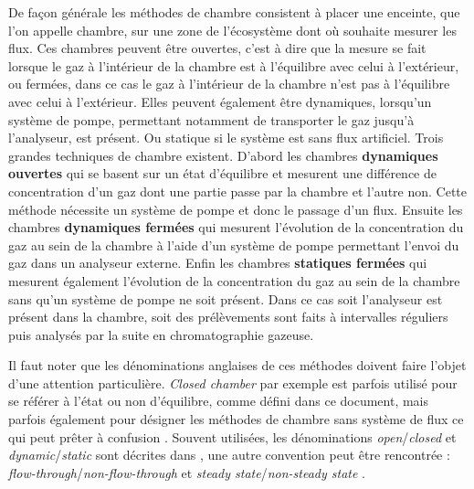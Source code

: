 De façon générale les méthodes de chambre consistent à placer une enceinte, que l'on appelle chambre, sur une zone de l'écosystème dont où souhaite mesurer les flux.
Ces chambres peuvent être ouvertes, c'est à dire que la mesure se fait lorsque le gaz à l'intérieur de la chambre est à l'équilibre avec celui à l'extérieur, ou fermées, dans ce cas le gaz à l'intérieur de la chambre n'est pas à l'équilibre avec celui à l'extérieur.
Elles peuvent également être dynamiques, lorsqu'un système de pompe, permettant notamment de transporter le gaz jusqu'à l'analyseur, est présent.
Ou statique si le système est sans flux artificiel.
Trois grandes techniques de chambre existent.
D'abord les chambres \textbf{dynamiques ouvertes} qui se basent sur un état d'équilibre et mesurent une différence de concentration d'un gaz dont une partie passe par la chambre et l'autre non. 
Cette méthode nécessite un système de pompe et donc le passage d'un flux.
Ensuite les chambres \textbf{dynamiques fermées} qui mesurent l'évolution de la concentration du gaz au sein de la chambre à l'aide d'un système de pompe permettant l'envoi du gaz dans un analyseur externe.
Enfin les chambres \textbf{statiques fermées} qui mesurent également l'évolution de la concentration du gaz au sein de la chambre sans qu'un système de pompe ne soit présent.
Dans ce cas soit l'analyseur est présent dans la chambre, soit des prélèvements sont faits à intervalles réguliers puis analysés par la suite en chromatographie gazeuse.

Il faut noter que les dénominations anglaises de ces méthodes doivent faire l'objet d'une attention particulière.
\textit{Closed chamber} par exemple est parfois utilisé pour se référer à l'état ou non d'équilibre, comme défini dans ce document, mais parfois également pour désigner les méthodes de chambre sans système de flux ce qui peut prêter à confusion \citep{pumpanen2004}.
Souvent utilisées, les dénominations \textit{open}/\textit{closed} et \textit{dynamic}/\textit{static} sont décrites dans \citep{luo2006161}, une autre convention peut être rencontrée : \textit{flow-through}/\textit{non-flow-through} et \textit{steady state}/\textit{non-steady state} \citep{livingston1995}.

